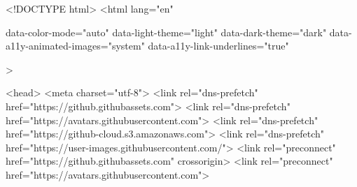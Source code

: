 





<!DOCTYPE html>
<html
  lang="en"
  
  data-color-mode="auto" data-light-theme="light" data-dark-theme="dark"
  data-a11y-animated-images="system" data-a11y-link-underlines="true"
  
  >




  <head>
    <meta charset="utf-8">
  <link rel="dns-prefetch" href="https://github.githubassets.com">
  <link rel="dns-prefetch" href="https://avatars.githubusercontent.com">
  <link rel="dns-prefetch" href="https://github-cloud.s3.amazonaws.com">
  <link rel="dns-prefetch" href="https://user-images.githubusercontent.com/">
  <link rel="preconnect" href="https://github.githubassets.com" crossorigin>
  <link rel="preconnect" href="https://avatars.githubusercontent.com">

  


